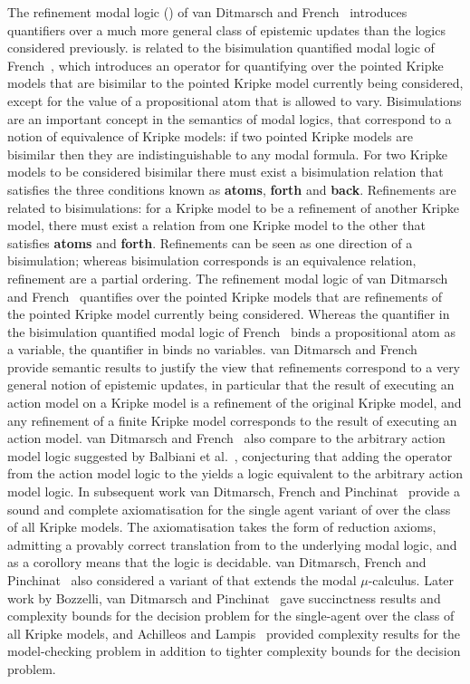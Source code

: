 The refinement modal logic (\logicRml{}) of van Ditmarsch and French~\cite{vanditmarsch:2009} introduces quantifiers over a much more general class of epistemic updates than the logics considered previously.
\logicRml{} is related to the bisimulation quantified modal logic of French~\cite{french:2006}, which introduces an operator for quantifying over the pointed Kripke models that are bisimilar to the pointed Kripke model currently being considered, except for the value of a propositional atom that is allowed to vary.
Bisimulations are an important concept in the semantics of modal logics, that correspond to a notion of equivalence of Kripke models: if two pointed Kripke models are bisimilar then they are indistinguishable to any modal formula.
For two Kripke models to be considered bisimilar there must exist a bisimulation relation that satisfies the three conditions known as {\bf atoms}, {\bf forth} and {\bf back}.
Refinements are related to bisimulations: for a Kripke model to be a refinement of another Kripke model, there must exist a relation from one Kripke model to the other that satisfies {\bf atoms} and {\bf forth}.
Refinements can be seen as one direction of a bisimulation; whereas bisimulation corresponds is an equivalence relation, refinement are a partial ordering.
The refinement modal logic of van Ditmarsch and French~\cite{vanditmarsch:2009} quantifies over the pointed Kripke models that are refinements of the pointed Kripke model currently being considered.
Whereas the quantifier in the bisimulation quantified modal logic of French~\cite{french:2006} binds a propositional atom as a variable, the quantifier in \logicRml{} binds no variables.
van Ditmarsch and French~\cite{vanditmarsch:2009} provide semantic results to justify the view that refinements correspond to a very general notion of epistemic updates, in particular that the result of executing an action model on a Kripke model is a refinement of the original Kripke model, and any refinement of a finite Kripke model corresponds to the result of executing an action model.
van Ditmarsch and French~\cite{vanditmarsch:2009} also compare \logicRml{} to the arbitrary action model logic suggested by Balbiani et al.~\cite{balbiani:2007}, conjecturing that adding the operator from the action model logic to the \logicRml{} yields a logic equivalent to the arbitrary action model logic.
In subsequent work van Ditmarsch, French and Pinchinat~\cite{vanditmarsch:2010} provide a sound and complete axiomatisation for the single agent variant of \logicRml{} over the class of all Kripke models.
The axiomatisation takes the form of reduction axioms, admitting a provably correct translation from \logicRml{} to the underlying modal logic, and as a corollory means that the logic is decidable.
van Ditmarsch, French and Pinchinat~\cite{vanditmarsch:2010} also considered a variant of \logicRml{} that extends the modal $\mu$-calculus.
Later work by Bozzelli, van Ditmarsch and Pinchinat~\cite{bozzelli:2014a} gave succinctness results and complexity bounds for the decision problem for the single-agent \logicRml{} over the class of all Kripke models, and Achilleos and Lampis~\cite{achilleos:2013} provided complexity results for the model-checking problem in addition to tighter complexity bounds for the decision problem.
